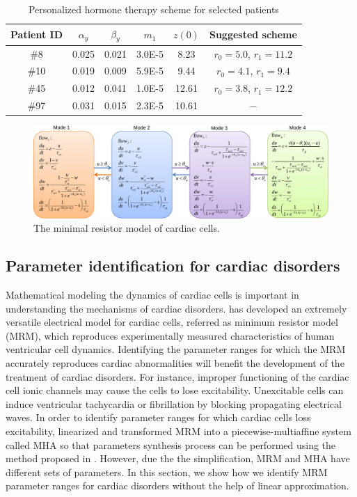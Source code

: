 \begin{table}[h]
\caption{Personalized hormone therapy scheme for selected patients\label{prostate2}}
\centering
\begin{tabular}{c|c|c|c|c|c}
\hline
Patient ID  & $\alpha_y$  & $\beta_y$ & $m_1$ & $z(0)$ & Suggested scheme  \\\hline
\#8 & 0.025 & 0.021  & 3.0E-5 & 8.23 & $r_0=5.0$, $r_1=11.2$ \\
\#10 & 0.019 & 0.009  & 5.9E-5 & 9.44 & $r_0=4.1$, $r_1=9.4$ \\
\#45 & 0.012  & 0.041  & 1.0E-5 & 12.61 & $r_0=3.8$, $r_1=12.2$ \\
\#97 & 0.031  & 0.015  & 2.3E-5 & 10.61 & $-$ \\
\hline
\end{tabular}
\end{table}




\begin{figure}[t]
\centering
\includegraphics[scale=0.5]{fig-cardiac}
\caption{The minimal resistor model of cardiac cells.}
\label{mrm}
\end{figure}


\subsection{Parameter identification for cardiac disorders}

Mathematical modeling the dynamics of cardiac cells is important in understanding the mechanisms of cardiac disorders. \cite{orovio08} has developed an extremely versatile electrical model for cardiac cells, referred as minimum resistor model (MRM), which reproduces experimentally measured characteristics of human ventricular cell dynamics. Identifying the parameter ranges for which the MRM accurately reproduces cardiac abnormalities will benefit the development of the treatment of cardiac disorders. For instance, improper functioning of the cardiac cell ionic channels may cause the cells to lose excitability. Unexcitable cells can induce ventricular tachycardia or fibrillation by blocking propagating electrical waves. In order to identify parameter ranges for which cardiac cells loss excitability, \cite{grosu11} linearized and transformed MRM into a piecewise-multiaffine system called MHA so that parameters synthesis process can be performed using the method proposed in \cite{rovergene}. However, due the the simplification, MRM and MHA have different sets of parameters. In this section, we show how we identify MRM parameter ranges for cardiac disorders without the help of linear approximation.



